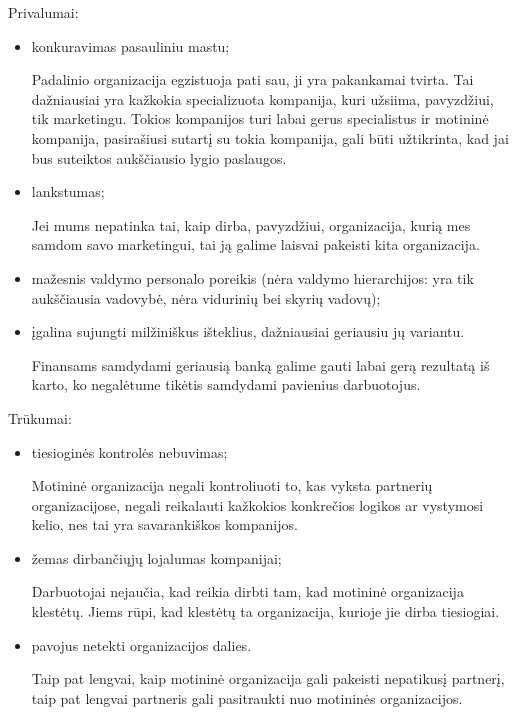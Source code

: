 Privalumai:
\begin{itemize}
  \item konkuravimas pasauliniu mastu;
    \begin{note}
      Padalinio organizacija egzistuoja pati sau, ji yra pakankamai
      tvirta. Tai dažniausiai yra kažkokia specializuota kompanija,
      kuri užsiima, pavyzdžiui, tik marketingu. Tokios kompanijos
      turi labai gerus specialistus ir motininė kompanija, pasirašiusi
      sutartį su tokia kompanija, gali būti užtikrinta, kad jai bus
      suteiktos aukščiausio lygio paslaugos.
    \end{note}
  \item lankstumas;
    \begin{note}
      Jei mums nepatinka tai, kaip dirba, pavyzdžiui, organizacija, kurią
      mes samdom savo marketingui, tai ją galime laisvai pakeisti
      kita organizacija.
    \end{note}
  \item mažesnis valdymo personalo poreikis (nėra valdymo hierarchijos:
    yra tik aukščiausia vadovybė, nėra vidurinių bei skyrių vadovų);
  \item įgalina sujungti milžiniškus išteklius, dažniausiai geriausiu jų
    variantu.
    \begin{exmp}
      Finansams samdydami geriausią banką galime gauti labai gerą
      rezultatą iš karto, ko negalėtume tikėtis samdydami pavienius
      darbuotojus.
    \end{exmp}
\end{itemize}

Trūkumai:
\begin{itemize}
  \item tiesioginės kontrolės nebuvimas;
    \begin{note}
      Motininė organizacija negali kontroliuoti to, kas vyksta partnerių
      organizacijose, negali reikalauti kažkokios konkrečios logikos
      ar vystymosi kelio, nes tai yra savarankiškos kompanijos.
    \end{note}
  \item žemas dirbančiųjų lojalumas kompanijai;
    \begin{note}
      Darbuotojai nejaučia, kad reikia dirbti tam, kad motininė
      organizacija klestėtų. Jiems rūpi, kad klestėtų ta organizacija,
      kurioje jie dirba tiesiogiai.
    \end{note}
  \item pavojus netekti organizacijos dalies.
    \begin{note}
      Taip pat lengvai, kaip motininė organizacija gali pakeisti
      nepatikusį partnerį, taip pat lengvai partneris gali pasitraukti
      nuo motininės organizacijos.
    \end{note}
\end{itemize}


